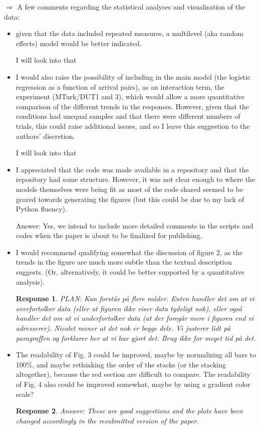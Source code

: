 \documentclass[a4paper]{article}
\newtheorem{response}{Response}
\newenvironment{robin}{\smallskip \noindent \color{red!10!green!50!blue}}{\color{black}\smallskip}
\begin{document}
$\Rightarrow$ A few comments regarding the statistical analyses and visualisation of the data:
\begin{itemize}
\item given that the data included repeated measures, a multilevel (aka random effects) model would be better indicated. 

\begin{robin} I will look into that \end{robin}
\item I would also raise the possibility of including in the main model (the logistic regression as a function of arrival pairs), as an interaction term, the experiment (MTurk/DUT1 and 3), which would allow a more quantitative comparison of the different trends in the responses. However, given that the conditions had unequal samples and that there were different numbers of trials, this could raise additional issues, and so I leave this suggestion to the authors' discretion. 

\begin{robin} I will look into that \end{robin}
\item I appreciated that the code was made available in a repository and that the repository had some structure. However, it was not clear enough to where the models themselves were being fit as most of the code shared seemed to be geared towards generating the figures (but this could be due to my lack of Python fluency). 

\begin{robin}Answer: Yes, we intend to include more detailed comments in the scripts and codes when the paper is about to be finalized for publishing. \end{robin}
\item I would recommend qualifying somewhat the discussion of figure 2, as the trends in the figure are much more subtle than the textual description suggests. (Or, alternatively, it could be better supported by a quantitative analysis).

\begin{response}
PLAN: Kan forstås på flere måder. Enten handler det om at vi overfortolker data (eller at figuren ikke viser data tydeligt nok), eller også handler det om at vi underfortolker data (at der foregår mere i figuren end vi adresserer). Nicolet mener at det nok er begge dele. Vi justerer lidt på paragraffen og forklarer her at vi har gjort det. Brug ikke for meget tid på det. 
\end{response}

\item The readability of Fig. 3 could be improved, maybe by normalizing all bars to 100\%, and maybe rethinking the order of the stacks (or the stacking altogether), because the red section are difficult to compare. The readability of Fig. 4 also could be improved somewhat, maybe by using a gradient color scale?

\begin{response}Answer: These are good suggestions and the plots have been changed accordingly in the resubmitted version of the paper. \end{response}
\end{itemize}
\end{document}
